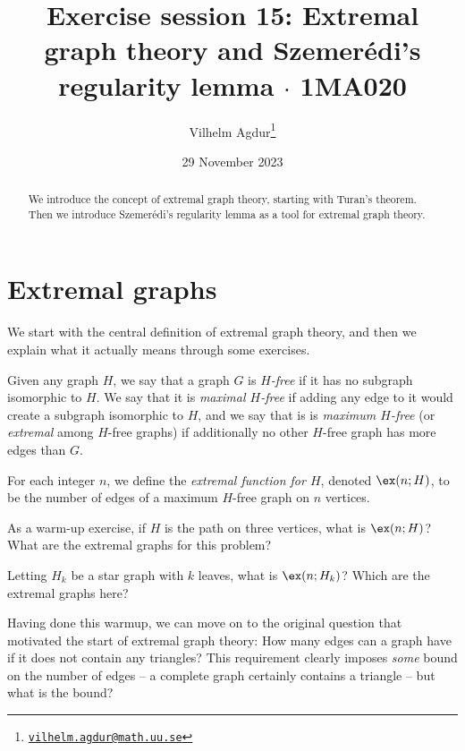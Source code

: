 \documentclass[nobib]{tufte-handout}
\title{Exercise session 15: Extremal graph theory and Szemerédi's regularity lemma $\cdot$ 1MA020}
\author[Vilhelm Agdur]{Vilhelm Agdur\thanks{\href{mailto:vilhelm.agdur@math.uu.se}{\nolinkurl{vilhelm.agdur@math.uu.se}}}}
\date{29 November 2023}
\begin{document}
\maketitle%

\begin{abstract}
\noindent
We introduce the concept of extremal graph theory, starting with Turan's theorem. Then we introduce Szemerédi's regularity lemma as a tool for extremal graph theory.
\end{abstract}

\section{Extremal graphs}

We start with the central definition of extremal graph theory, and then we explain what it actually means through some exercises.

\begin{definition}
  Given any graph $H$, we say that a graph $G$ is \emph{$H$-free} if it has no subgraph isomorphic to $H$. We say that it is \emph{maximal $H$-free} if adding any edge to it would create a subgraph isomorphic to $H$, and we say that is is \emph{maximum $H$-free} (or \emph{extremal} among $H$-free graphs) if additionally no other $H$-free graph has more edges than $G$.

  For each integer $n$, we define the \emph{extremal function for $H$}, denoted $\ex(n; H)$, to be the number of edges of a maximum $H$-free graph on $n$ vertices.
\end{definition}

\begin{xca}
  As a warm-up exercise, if $H$ is the path on three vertices, what is $\ex(n;H)$? What are the extremal graphs for this problem?

  Letting $H_k$ be a star graph with $k$ leaves, what is $\ex(n;H_k)$? Which are the extremal graphs here?
\end{xca}

Having done this warmup, we can move on to the original question that motivated the start of extremal graph theory: How many edges can a graph have if it does not contain any triangles? This requirement clearly imposes \emph{some} bound on the number of edges -- a complete graph certainly contains a triangle -- but what is the bound?
\end{document}
